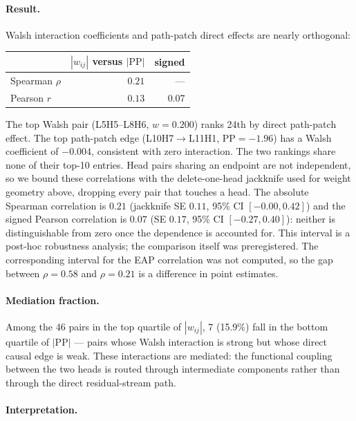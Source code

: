 \documentclass{article}
\begin{document}
\paragraph{Result.}

Walsh interaction coefficients and path-patch direct effects are nearly
orthogonal:

\medskip

\begin{tabular}{lrr}
\toprule
 & $|w_{ij}|$ versus $|\text{PP}|$ & signed \\
\midrule
Spearman $\rho$  & $0.21$ & --- \\
Pearson $r$      & $0.13$ & $0.07$ \\
\bottomrule
\end{tabular}

\medskip

The top Walsh pair (L5H5--L8H6, $w = 0.200$) ranks 24th by direct
path-patch effect. The top path-patch edge (L10H7$\to$L11H1,
$\text{PP} = -1.96$) has a Walsh coefficient of $-0.004$, consistent
with zero interaction. The two rankings share none of their top-10 entries. Head pairs sharing an endpoint are not independent, so we bound these correlations with the delete-one-head jackknife used for weight geometry above, dropping every pair that touches a head. The absolute Spearman correlation is $0.21$ (jackknife SE $0.11$, 95\% CI $[-0.00, 0.42]$) and the signed Pearson correlation is $0.07$ (SE $0.17$, 95\% CI $[-0.27, 0.40]$): neither is distinguishable from zero once the dependence is accounted for. This interval is a post-hoc robustness analysis; the comparison itself was preregistered. The corresponding interval for the EAP correlation was not computed, so the gap between $\rho = 0.58$ and $\rho = 0.21$ is a difference in point estimates.

\paragraph{Mediation fraction.}

Among the 46 pairs in the top quartile of $|w_{ij}|$, 7 (15.9\%) fall
in the bottom quartile of $|\text{PP}|$ --- pairs whose Walsh interaction
is strong but whose direct causal edge is weak. These interactions are
mediated: the functional coupling between the two heads is routed through
intermediate components rather than through the direct residual-stream
path.

\paragraph{Interpretation.}
\end{document}
